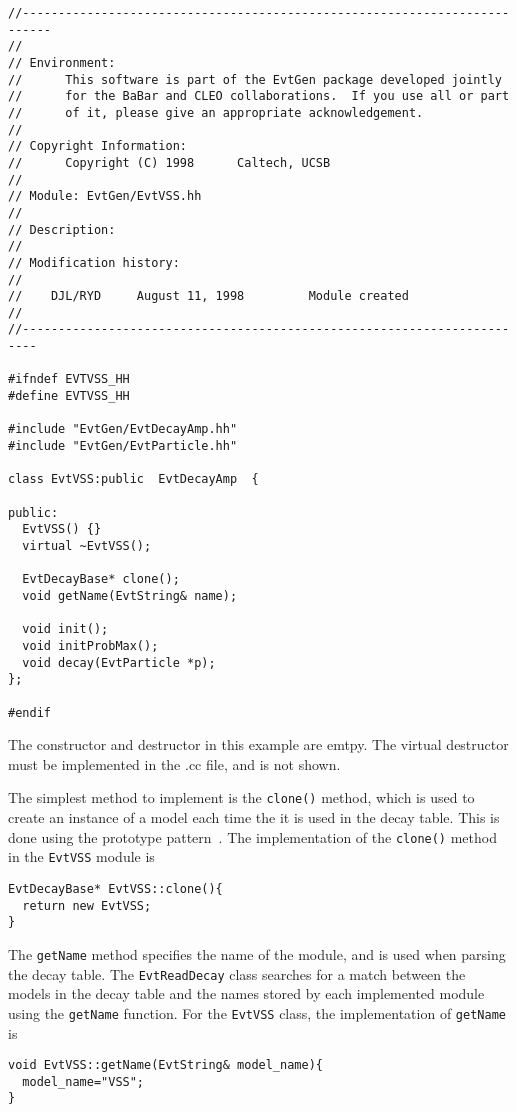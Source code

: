 {\footnotesize
\begin{verbatim}
//--------------------------------------------------------------------------
//
// Environment:
//      This software is part of the EvtGen package developed jointly
//      for the BaBar and CLEO collaborations.  If you use all or part
//      of it, please give an appropriate acknowledgement.
//
// Copyright Information:
//      Copyright (C) 1998      Caltech, UCSB
//
// Module: EvtGen/EvtVSS.hh
//
// Description:
//
// Modification history:
//
//    DJL/RYD     August 11, 1998         Module created
//
//------------------------------------------------------------------------

#ifndef EVTVSS_HH
#define EVTVSS_HH

#include "EvtGen/EvtDecayAmp.hh"
#include "EvtGen/EvtParticle.hh"

class EvtVSS:public  EvtDecayAmp  {

public:
  EvtVSS() {}
  virtual ~EvtVSS();

  EvtDecayBase* clone();
  void getName(EvtString& name);

  void init();
  void initProbMax();
  void decay(EvtParticle *p); 
};

#endif
\end{verbatim}
}

The constructor and destructor in this example are emtpy.  
The virtual destructor must be implemented in the {.cc} file, and
is not shown.

The simplest method to implement is the {\tt clone()}
method, which is used to create an instance of a model each time
the it is used in the decay table. 
This is done using the prototype
pattern~\cite{Gangof4}.
The implementation of the {\tt clone()} method in the {\tt EvtVSS} module
is

\begin{footnotesize}
\begin{verbatim}
EvtDecayBase* EvtVSS::clone(){
  return new EvtVSS;
}
\end{verbatim}
\end{footnotesize}

The {\tt getName} method specifies the name of the module, and 
is used when parsing the decay table.  The {\tt EvtReadDecay}
class searches for a match between the models in the decay
table and the names stored by each implemented module
using the {\tt getName} function.  For the {\tt EvtVSS}
class, the implementation of {\tt getName} is 

\begin{footnotesize}
\begin{verbatim}
void EvtVSS::getName(EvtString& model_name){
  model_name="VSS"; 
}
\end{verbatim}
\end{footnotesize}

